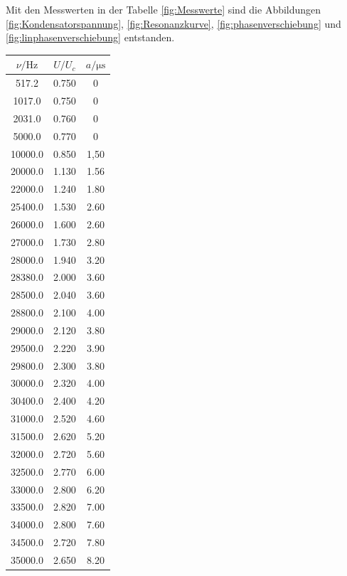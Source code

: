 Mit den Messwerten in der Tabelle \ref{fig:Messwerte} sind die  Abbildungen
\ref{fig:Kondensatorspannung}, \ref{fig:Resonanzkurve},
\ref{fig:phasenverschiebung} und \ref{fig:linphasenverschiebung}
entstanden.
\begin{table}
  \centering
  \begin{tabular}{c c c}
    \toprule
    $\nu/\si{\hertz}$ & $U/U_c$ & $a/\si{\micro\second}$ \\
    \midrule
         517.2  &  0.750  &  0     \\
        1017.0  &  0.750  &  0     \\
        2031.0  &  0.760  &  0     \\
        5000.0  &  0.770  &  0     \\
       10000.0  &  0.850  &  1,50  \\
       20000.0  &  1.130  &  1.56  \\
       22000.0  &  1.240  &  1.80  \\
       25400.0  &  1.530  &  2.60  \\
       26000.0  &  1.600  &  2.60  \\
       27000.0  &  1.730  &  2.80  \\
       28000.0  &  1.940  &  3.20  \\
       28380.0  &  2.000  &  3.60  \\
       28500.0  &  2.040  &  3.60  \\
       28800.0  &  2.100  &  4.00  \\
       29000.0  &  2.120  &  3.80  \\
       29500.0  &  2.220  &  3.90  \\
       29800.0  &  2.300  &  3.80  \\
       30000.0  &  2.320  &  4.00  \\
       30400.0  &  2.400  &  4.20  \\
       31000.0  &  2.520  &  4.60  \\
       31500.0  &  2.620  &  5.20  \\
       32000.0  &  2.720  &  5.60  \\
       32500.0  &  2.770  &  6.00  \\
       33000.0  &  2.800  &  6.20  \\
       33500.0  &  2.820  &  7.00  \\
       34000.0  &  2.800  &  7.60  \\
       34500.0  &  2.720  &  7.80  \\
       35000.0  &  2.650  &  8.20  \\

\end{tabular}
\end{table}
